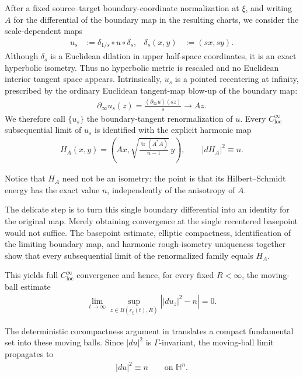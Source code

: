 \documentclass[11pt]{amsart}
\theoremstyle{plain}
\theoremstyle{plain}
\theoremstyle{plain}
\newcommand{\Hn}{\mathbb H^n}
\newcommand{\bdry}{\partial_\infty}
\numberwithin{equation}{section}
\begin{document}
After a fixed source--target boundary-coordinate normalization at
\(\xi\), and writing \(A\) for the differential of the boundary map in
the resulting charts, we consider the scale-dependent maps
\begin{align}
u_s
&:=
\delta_{1/s}\circ u\circ\delta_s,
&
\delta_s(x,y)&:=(sx,sy).
\nonumber
\end{align}
Although \(\delta_s\) is a Euclidean dilation in upper half-space
coordinates, it is an exact hyperbolic isometry.  Thus no hyperbolic
metric is rescaled and no Euclidean interior tangent space appears.
Intrinsically, \(u_s\) is a pointed recentering at infinity, prescribed by
the ordinary Euclidean tangent-map blow-up of the boundary map:
\begin{align}
\bdry u_s(z)
=
\frac{(\bdry u)(sz)}s
\longrightarrow
Az.
\nonumber
\end{align}
We therefore call \(\{u_s\}\) the boundary-tangent renormalization of
\(u\).  Every \(C^\infty_{\mathrm{loc}}\) subsequential limit of
\(u_s\) is identified with the explicit harmonic map
\begin{align}
H_A(x,y)
=
\left(
Ax,
\sqrt{\frac{\operatorname{tr}(A^*A)}{n-1}}\,y
\right),
\qquad
|dH_A|^2\equiv n.
\nonumber
\end{align}

Notice that \(H_A\) need not be an isometry: the point is that its
Hilbert--Schmidt energy has the exact value \(n\), independently of the
anisotropy of \(A\).

The delicate step is to turn this single boundary differential into an
identity for the original map.  Merely obtaining convergence at the single
recentered basepoint would not suffice.  The basepoint estimate, elliptic
compactness, identification of the limiting boundary map, and harmonic
rough-isometry uniqueness together show that every subsequential limit of
the renormalized family equals \(H_A\).  

This yields full
\(C^\infty_{\mathrm{loc}}\) convergence and hence, for every fixed
\(R<\infty\), the moving-ball estimate
\begin{align}
\lim_{t\to\infty}
\sup_{z\in B(r_\xi(t),R)}
\left||du_z|^2-n\right|
=0.
\nonumber
\end{align}

The deterministic cocompactness argument in
 translates a compact fundamental set into
these moving balls.  Since \(|du|^2\) is \(\Gamma\)-invariant, the
moving-ball limit propagates to
\begin{align}
|du|^2\equiv n
\qquad\text{on }\Hn.
\nonumber
\end{align}
\end{document}

